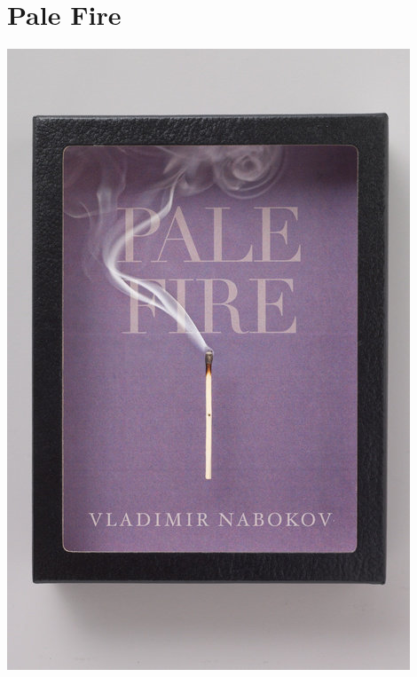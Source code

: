 \documentclass{tufte-handout}
\makeatletter
\newcommand{\varcaption}[2][0pt]{%
  \gsetlength{\@tufte@caption@vertical@offset}{-#1}%
  \gdef\@tufte@stored@varcaption{#2}%
}
\gdef\@tufte@stored@varcaption{} %
\makeatother
\begin{document}
\section*{Pale Fire}
\begin{marginfigure}[10\baselineskip]
   \includegraphics[width=\linewidth]{images/pale_fire.jpg}
   \varcaption{\href{https://www.penguinrandomhouse.com/books/119451/pale-fire-by-vladimir-nabokov/9780679410775/}{Publisher Link}, \href{https://www.amazon.com/Pale-Fire-Vladimir-Nabokov/dp/0679723420/}{Amazon Link}}
\end{marginfigure}
\end{document}
